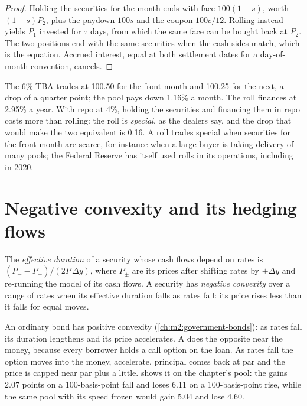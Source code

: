 \begin{proof}
Holding the securities for the month ends with face $100(1-s)$, worth
$(1-s)P_2$, plus the paydown $100s$ and the coupon $100c/12$. Rolling
instead yields $P_1$ invested for $\tau$ days, from which the same face can be
bought back at $P_2$. The two positions end with the same securities when the
cash sides match, which is the equation. Accrued interest, equal at both
settlement dates for a day-of-month convention, cancels.
\end{proof}

\begin{example}[A roll]\label{ex:m2:mortgages-and-agencies:roll}
The 6\% TBA trades at 100.50 for the front month and 100.25 for the next, a
drop of a quarter point; the pool pays down 1.16\% a month. The roll finances at
2.95\% a year. With repo at 4\%, holding the securities and financing them in
repo costs more than rolling: the roll is \emph{special}, as the dealers say,
and the drop that would make the two equivalent is 0.16. A roll trades special
when securities for the front month are scarce, for instance when a large buyer
is taking delivery of many pools; the Federal Reserve has itself used rolls in
its operations, including in 2020.
\end{example}

\section{Negative convexity and its hedging flows}

\begin{definition}\label{def:m2:mortgages-and-agencies:convexity}
The \emph{effective duration} of a security whose
cash flows depend on rates is $(P_- - P_+)/(2P\,\Delta y)$, where $P_\pm$ are
its prices after shifting rates by $\pm\Delta y$ and re-running the model of
its cash flows. A security has \emph{negative convexity} over a range of rates when its effective duration falls as rates
fall: its price rises less than it falls for equal moves.
\end{definition}

An ordinary bond has positive convexity (\cref{ch:m2:government-bonds}): as
rates fall its duration lengthens and its price accelerates. A  does
the opposite near the money, because every borrower holds a call option on the
loan. As rates fall the option moves into the money,  accelerate,
principal comes back at par and the price is capped near par plus a little.
 shows it on the chapter's pool:
the  gains 2.07 points on a 100-basis-point fall and loses 6.11 on
a 100-basis-point rise, while the same pool with its speed frozen would gain
5.04 and lose 4.60.

